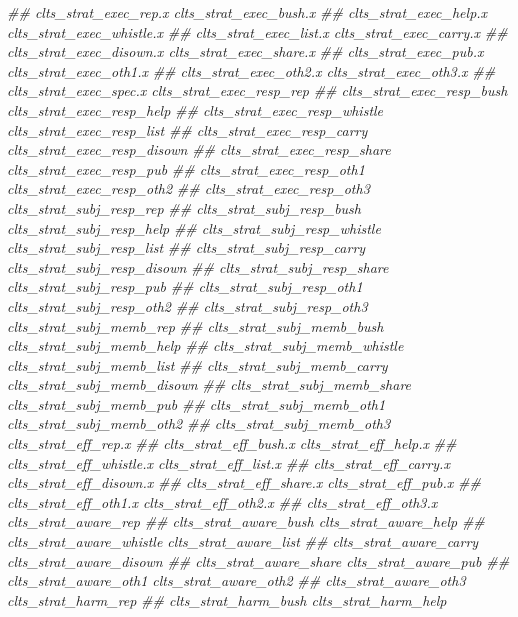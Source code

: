 \documentclass[
]{article}
\newenvironment{Shaded}{\begin{snugshade}}{\end{snugshade}}
\newcommand{\CommentTok}[1]{\textcolor[rgb]{0.56,0.35,0.01}{\textit{#1}}}
\begin{document}
\begin{Shaded}
\begin{Highlighting}[]
\CommentTok{##      clts_strat_exec_rep.x clts_strat_exec_bush.x}
\CommentTok{##      clts_strat_exec_help.x clts_strat_exec_whistle.x}
\CommentTok{##      clts_strat_exec_list.x clts_strat_exec_carry.x}
\CommentTok{##      clts_strat_exec_disown.x clts_strat_exec_share.x}
\CommentTok{##      clts_strat_exec_pub.x clts_strat_exec_oth1.x}
\CommentTok{##      clts_strat_exec_oth2.x clts_strat_exec_oth3.x}
\CommentTok{##      clts_strat_exec_spec.x clts_strat_exec_resp_rep}
\CommentTok{##      clts_strat_exec_resp_bush clts_strat_exec_resp_help}
\CommentTok{##      clts_strat_exec_resp_whistle clts_strat_exec_resp_list}
\CommentTok{##      clts_strat_exec_resp_carry clts_strat_exec_resp_disown}
\CommentTok{##      clts_strat_exec_resp_share clts_strat_exec_resp_pub}
\CommentTok{##      clts_strat_exec_resp_oth1 clts_strat_exec_resp_oth2}
\CommentTok{##      clts_strat_exec_resp_oth3 clts_strat_subj_resp_rep}
\CommentTok{##      clts_strat_subj_resp_bush clts_strat_subj_resp_help}
\CommentTok{##      clts_strat_subj_resp_whistle clts_strat_subj_resp_list}
\CommentTok{##      clts_strat_subj_resp_carry clts_strat_subj_resp_disown}
\CommentTok{##      clts_strat_subj_resp_share clts_strat_subj_resp_pub}
\CommentTok{##      clts_strat_subj_resp_oth1 clts_strat_subj_resp_oth2}
\CommentTok{##      clts_strat_subj_resp_oth3 clts_strat_subj_memb_rep}
\CommentTok{##      clts_strat_subj_memb_bush clts_strat_subj_memb_help}
\CommentTok{##      clts_strat_subj_memb_whistle clts_strat_subj_memb_list}
\CommentTok{##      clts_strat_subj_memb_carry clts_strat_subj_memb_disown}
\CommentTok{##      clts_strat_subj_memb_share clts_strat_subj_memb_pub}
\CommentTok{##      clts_strat_subj_memb_oth1 clts_strat_subj_memb_oth2}
\CommentTok{##      clts_strat_subj_memb_oth3 clts_strat_eff_rep.x}
\CommentTok{##      clts_strat_eff_bush.x clts_strat_eff_help.x}
\CommentTok{##      clts_strat_eff_whistle.x clts_strat_eff_list.x}
\CommentTok{##      clts_strat_eff_carry.x clts_strat_eff_disown.x}
\CommentTok{##      clts_strat_eff_share.x clts_strat_eff_pub.x}
\CommentTok{##      clts_strat_eff_oth1.x clts_strat_eff_oth2.x}
\CommentTok{##      clts_strat_eff_oth3.x clts_strat_aware_rep}
\CommentTok{##      clts_strat_aware_bush clts_strat_aware_help}
\CommentTok{##      clts_strat_aware_whistle clts_strat_aware_list}
\CommentTok{##      clts_strat_aware_carry clts_strat_aware_disown}
\CommentTok{##      clts_strat_aware_share clts_strat_aware_pub}
\CommentTok{##      clts_strat_aware_oth1 clts_strat_aware_oth2}
\CommentTok{##      clts_strat_aware_oth3 clts_strat_harm_rep}
\CommentTok{##      clts_strat_harm_bush clts_strat_harm_help}

\end{Highlighting}
\end{Shaded}
\end{document}
